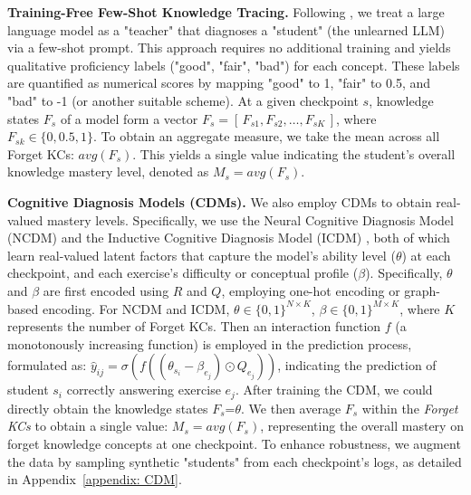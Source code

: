 \noindent 
\textbf{Training-Free Few-Shot Knowledge Tracing.} 
    Following \citet{li2024explainable}, we treat a large language model as a "teacher" that diagnoses a "student" (\ie the unlearned LLM) via a few-shot prompt. This approach requires no additional training and yields qualitative proficiency labels (\eg "good", "fair", "bad") for each concept. These labels are quantified as numerical scores by mapping "good" to 1, "fair" to 0.5, and "bad" to -1 (or another suitable scheme). At a given   checkpoint \(s\),   knowledge states \(F_s\) of a model form  a vector \(F_s = [\, F_{s1}, F_{s2}, \dots, F_{sK} \,]\),
where \(F_{sk} \in \{0, 0.5, 1\}\). To obtain an aggregate measure, we take the mean across all Forget KCs: \(avg(F_s)\). This yields a single value indicating the student's overall knowledge mastery level, denoted as $M_s= avg(F_s)$.

\noindent  
\textbf{Cognitive Diagnosis Models (CDMs).} 
    We also employ CDMs to obtain real-valued mastery levels. Specifically, we use the Neural Cognitive Diagnosis Model (NCDM) \citep{wang2020neural} and the Inductive Cognitive Diagnosis Model (ICDM) \citep{liu2024inductive}, both of which learn real-valued latent factors that capture the model's ability level (\(\theta\)) at each checkpoint, and each exercise’s difficulty or conceptual profile (\(\beta\)). Specifically, \(\theta\) and \(\beta\) are first encoded using \(R\) and \(Q\), employing one-hot encoding or graph-based encoding. For NCDM and ICDM, \(\displaystyle \theta \in \{0,1\}^{N \times K}\), \(\displaystyle \beta \in \{0,1\}^{M \times K}\), where $K$ represents the number of Forget KCs. Then an interaction function \( f \) (a monotonously increasing function) is employed in the   prediction process, formulated as:  
\( \hat{y}_{ij} = \sigma \left( f \left( (\theta_{s_i} - \beta_{e_j}) \odot Q_{e_j} \right) \right) \), indicating the prediction of student $s_i$ correctly answering exercise $e_j$. After training the CDM, we could directly obtain the knowledge states \(F_s\)=\(\theta\). We then average \(F_s\) within the \emph{Forget KCs} to obtain a single value:  $M_s= avg(F_s)$, representing the  overall mastery on forget knowledge concepts at one checkpoint.
To enhance robustness, we augment the data by sampling synthetic "students" from each checkpoint’s logs, as detailed in Appendix~\ref{appendix: CDM}.
    

    
   

\vspace{-0.05in}








